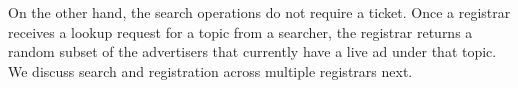 On the other hand, the search operations do not require a ticket. Once a registrar receives a lookup request for a topic from a searcher, the registrar returns a random subset of the advertisers that currently have a live ad under that topic. We discuss search and registration across multiple registrars next.




